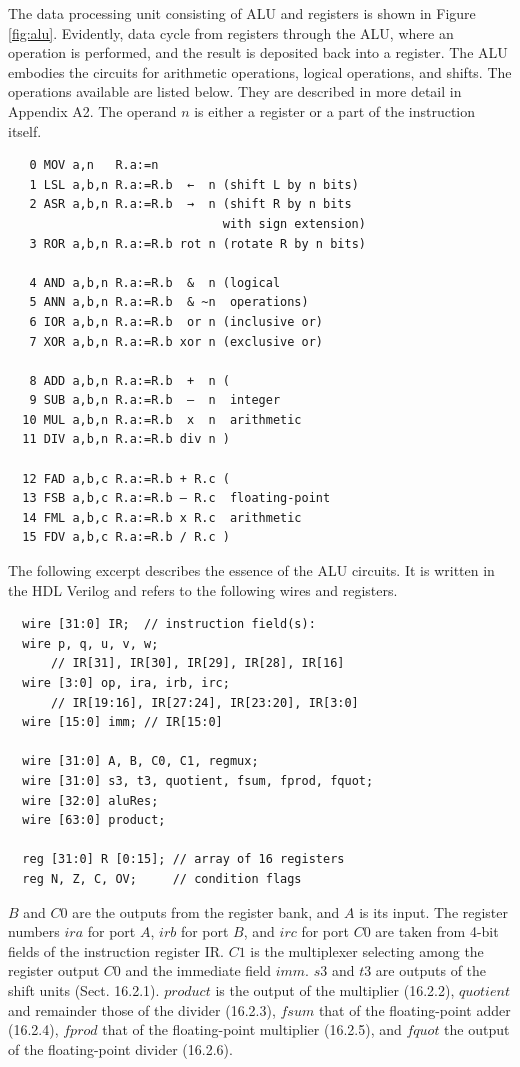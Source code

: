 The data processing unit consisting of ALU and registers is shown in Figure \ref{fig:alu}. Evidently, data
cycle from registers through the ALU, where an operation is performed, and the result is deposited
back into a register. The ALU embodies the circuits for arithmetic operations, logical operations,
and shifts. The operations available are listed below. They are described in more detail in
Appendix A2. The operand $n$ is either a register or a part of the instruction itself.

\begin{verbatim}
   0 MOV a,n   R.a:=n
   1 LSL a,b,n R.a:=R.b  ←  n (shift L by n bits)
   2 ASR a,b,n R.a:=R.b  →  n (shift R by n bits
                              with sign extension)
   3 ROR a,b,n R.a:=R.b rot n (rotate R by n bits)

   4 AND a,b,n R.a:=R.b  &  n (logical
   5 ANN a,b,n R.a:=R.b  & ~n  operations)
   6 IOR a,b,n R.a:=R.b  or n (inclusive or)
   7 XOR a,b,n R.a:=R.b xor n (exclusive or)

   8 ADD a,b,n R.a:=R.b  +  n (
   9 SUB a,b,n R.a:=R.b  –  n  integer
  10 MUL a,b,n R.a:=R.b  x  n  arithmetic
  11 DIV a,b,n R.a:=R.b div n )

  12 FAD a,b,c R.a:=R.b + R.c (
  13 FSB a,b,c R.a:=R.b – R.c  floating-point
  14 FML a,b,c R.a:=R.b x R.c  arithmetic
  15 FDV a,b,c R.a:=R.b / R.c )
\end{verbatim}

The following excerpt describes the essence of the ALU circuits. It is written in the HDL Verilog
and refers to the following wires and registers.

\begin{verbatim}
  wire [31:0] IR;  // instruction field(s):
  wire p, q, u, v, w;
      // IR[31], IR[30], IR[29], IR[28], IR[16]
  wire [3:0] op, ira, irb, irc;
      // IR[19:16], IR[27:24], IR[23:20], IR[3:0]
  wire [15:0] imm; // IR[15:0]

  wire [31:0] A, B, C0, C1, regmux;
  wire [31:0] s3, t3, quotient, fsum, fprod, fquot;
  wire [32:0] aluRes;
  wire [63:0] product;

  reg [31:0] R [0:15]; // array of 16 registers
  reg N, Z, C, OV;     // condition flags
\end{verbatim}

$B$ and $C0$ are the outputs from the register bank, and $A$ is its input. The register numbers $ira$ for port
$A$, $irb$ for port $B$, and $irc$ for port $C0$ are taken from 4-bit fields of the instruction register IR. $C1$ is the
multiplexer selecting among the register output $C0$ and the immediate field $imm$. $s3$ and $t3$ are
outputs of the shift units (Sect. 16.2.1). $product$ is the output of the multiplier (16.2.2), $quotient$ and
remainder those of the divider (16.2.3), $fsum$ that of the floating-point adder (16.2.4), $fprod$ that of the
floating-point multiplier (16.2.5), and $fquot$ the output of the floating-point divider (16.2.6).

